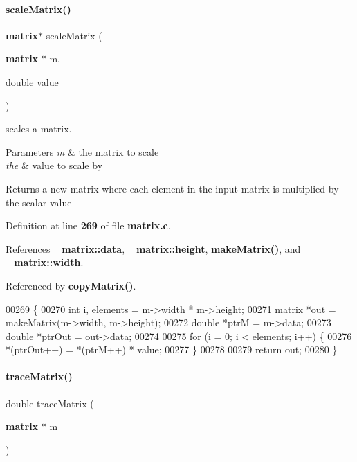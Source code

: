 \paragraph{scale\+Matrix()}
{\footnotesize\ttfamily \textbf{ matrix}$\ast$ scale\+Matrix (\begin{DoxyParamCaption}\item[{\textbf{ matrix} $\ast$}]{m,  }\item[{double}]{value }\end{DoxyParamCaption})}



scales a matrix. 


\begin{DoxyParams}{Parameters}
{\em m} & the matrix to scale \\
\hline
{\em the} & value to scale by \\
\hline
\end{DoxyParams}
\begin{DoxyReturn}{Returns}
a new matrix where each element in the input matrix is multiplied by the scalar value 
\end{DoxyReturn}


Definition at line \textbf{ 269} of file \textbf{ matrix.\+c}.



References \textbf{ \+\_\+matrix\+::data}, \textbf{ \+\_\+matrix\+::height}, \textbf{ make\+Matrix()}, and \textbf{ \+\_\+matrix\+::width}.



Referenced by \textbf{ copy\+Matrix()}.


\begin{DoxyCode}
00269                                              \{
00270   \textcolor{keywordtype}{int} i, elements = m->width * m->height;
00271   matrix *out = makeMatrix(m->width, m->height);
00272   \textcolor{keywordtype}{double} *ptrM = m->data;
00273   \textcolor{keywordtype}{double} *ptrOut = out->data;
00274 
00275   \textcolor{keywordflow}{for} (i = 0; i < elements; i++) \{
00276     *(ptrOut++) = *(ptrM++) * value;
00277   \}
00278 
00279   \textcolor{keywordflow}{return} out;
00280 \}
\end{DoxyCode}
\mbox{\label{a00041_a4794df8b2032f961dd8b2d90276bc417}} 
\paragraph{trace\+Matrix()}
{\footnotesize\ttfamily double trace\+Matrix (\begin{DoxyParamCaption}\item[{\textbf{ matrix} $\ast$}]{m }\end{DoxyParamCaption})}



